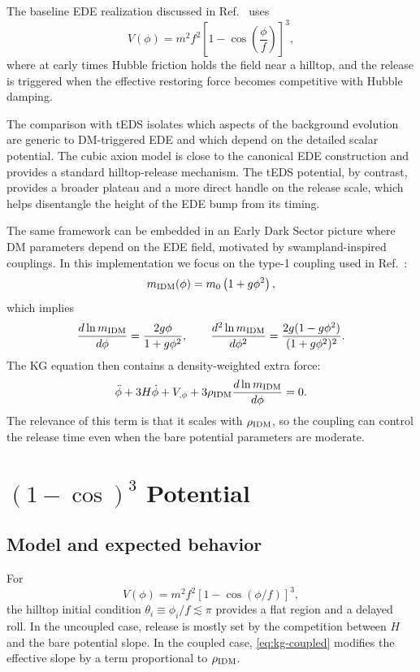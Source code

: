 \documentclass[aps,onecolumn,prd,nofootinbib,superscriptaddress,10pt,longbibliography,floatfix]{revtex4-2}
\begin{document}
The baseline EDE realization discussed in Ref.~\cite{McDonough:2021} uses
\begin{equation}
V(\phi)=m^2 f^2\left[1-\cos\!\left(\frac{\phi}{f}\right)\right]^3,
\label{eq:ede-cubic}
\end{equation}
where at early times Hubble friction holds the field near a hilltop, and the release is triggered when the effective restoring force becomes competitive with Hubble damping.

The comparison with tEDS isolates which aspects of the background evolution are generic to DM-triggered EDE and which depend on the detailed scalar potential. The cubic axion model is close to the canonical EDE construction and provides a standard hilltop-release mechanism. The tEDS potential, by contrast, provides a broader plateau and a more direct handle on the release scale, which helps disentangle the height of the EDE bump from its timing.

The same framework can be embedded in an Early Dark Sector picture where DM parameters depend on the EDE field, motivated by swampland-inspired couplings. In this implementation we focus on the type-1 coupling used in Ref.~\cite{Lin:2022teds}:
\begin{equation}
m_{\rm IDM}(\phi)=m_0\left(1+g\phi^2\right),
\label{eq:poly-mass}
\end{equation}
which implies
\begin{equation}
\frac{d\ln m_{\rm IDM}}{d\phi}=\frac{2g\phi}{1+g\phi^2},\qquad
\frac{d^2\ln m_{\rm IDM}}{d\phi^2}=\frac{2g(1-g\phi^2)}{(1+g\phi^2)^2}.
\end{equation}
The KG equation then contains a density-weighted extra force:
\begin{equation}
\ddot{\phi}+3H\dot{\phi}+V_{,\phi}+3\rho_{\rm IDM}\frac{d\ln m_{\rm IDM}}{d\phi}=0.
\label{eq:kg-coupled}
\end{equation}
The relevance of this term is that it scales with $\rho_{\rm IDM}$, so the coupling can control the release time even when the bare potential parameters are moderate.

\section{$(1-\cos)^3$ Potential}
\subsection{Model and expected behavior}
For
\begin{equation}
V(\phi)=m^2 f^2 \left[1-\cos(\phi/f)\right]^3,
\end{equation}
the hilltop initial condition $\theta_i\equiv \phi_i/f \lesssim \pi$ provides a flat region and a delayed roll. In the uncoupled case, release is mostly set by the competition between $H$ and the bare potential slope. In the coupled case, \cref{eq:kg-coupled} modifies the effective slope by a term proportional to $\rho_{\rm IDM}$.
\end{document}
